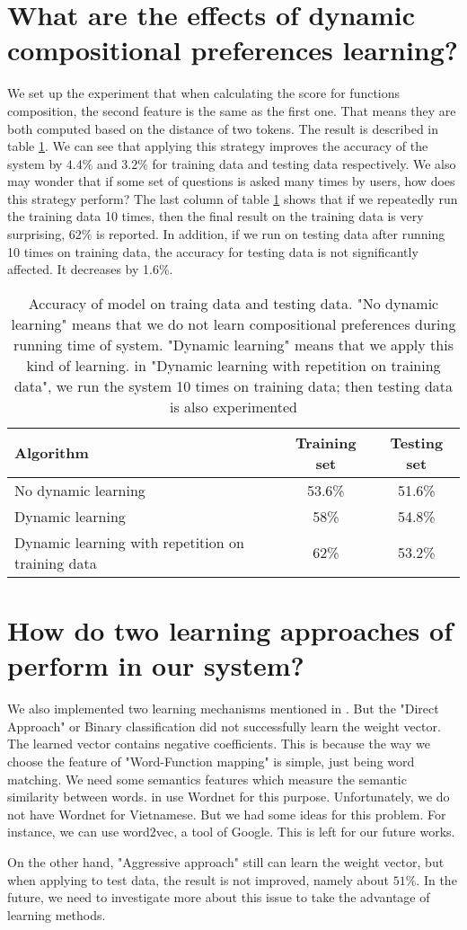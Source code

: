 \section{What are the effects of dynamic compositional preferences learning?}
We set up the experiment that when calculating the score for functions composition, the second feature is the same as the first one. That means they are both computed based on the distance of two tokens. The result is described in table \ref{d-c-p-eff}. We can see that applying this strategy improves the accuracy of the system by $4.4\%$ and $3.2\%$ for training data and testing data respectively. We also may wonder that if some set of questions is asked many times by users, how does this strategy perform? The last column of table \ref{d-c-p-eff} shows that if we repeatedly run the training data 10 times, then the final result on the training data is very surprising, $62\%$ is reported. In addition, if we run on testing data after running 10 times on training data, the accuracy for testing data is not significantly affected. It decreases by 1.6\%. 
\begin{table}[h] 
	\begin{center}
	    \begin{tabular}{| p{5cm} | c | c |}
	    \hline
	    Algorithm & Training set & Testing set \\ \hline
		No dynamic learning & 53.6\% & 51.6\%  \\ \hline
	    Dynamic learning & 58\% & 54.8\%  \\ \hline
	    Dynamic learning with repetition on training data & 62\% & 53.2\%  \\
	    \hline
	    \end{tabular}        
	\end{center}
	\scriptsize
	\caption{Accuracy of model on traing data and testing data. "No dynamic learning" means that we do not learn compositional preferences during running time of system. "Dynamic learning" means that we apply this kind of learning. in "Dynamic learning with repetition on training data", we run the system 10 times on training data; then testing data is also experimented}
    \label{d-c-p-eff}
\end{table}

\section{How do two learning approaches of \cite{Clarke:2010:DSP:1870568.1870571} perform in our system?}
We also implemented two learning mechanisms mentioned in \cite{Clarke:2010:DSP:1870568.1870571}. But the "Direct Approach" or Binary classification did not successfully learn the weight vector. The learned vector contains negative coefficients. This is because the way we choose the feature of "Word-Function mapping" is simple, just being word matching. We need some semantics features which measure the semantic similarity between words. \citeauthor{Clarke:2010:DSP:1870568.1870571} in \cite{Clarke:2010:DSP:1870568.1870571} use Wordnet for this purpose. Unfortunately, we do not have Wordnet for Vietnamese. But we had some ideas for this problem. For instance, we can use word2vec, a tool of Google. This is left for our future works.

On the other hand, "Aggressive approach" still can learn the weight vector, but when applying to test data, the result is not improved, namely about $51\%$. In the future, we need to investigate more about this issue to take the advantage of learning methods.